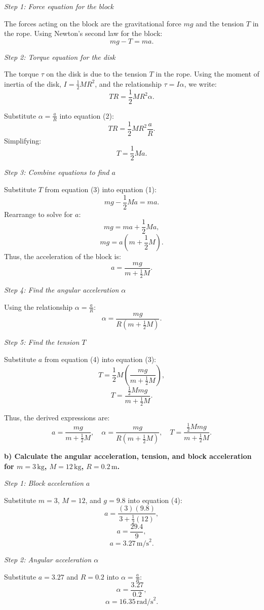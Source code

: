 \textit{Step 1: Force equation for the block}

The forces acting on the block are the gravitational force $mg$ and the tension $T$ in the rope. Using Newton's second law for the block:
\[
mg - T = ma. \tag{1}
\]

\textit{Step 2: Torque equation for the disk}

The torque $\tau$ on the disk is due to the tension $T$ in the rope. Using the moment of inertia of the disk, $I = \frac{1}{2}MR^2$, and the relationship $\tau = I\alpha$, we write:
\[
TR = \frac{1}{2}MR^2\alpha. \tag{2}
\]

Substitute $\alpha = \frac{a}{R}$ into equation (2):
\[
TR = \frac{1}{2}MR^2\frac{a}{R}.
\]
Simplifying:
\[
T = \frac{1}{2}Ma. \tag{3}
\]

\textit{Step 3: Combine equations to find $a$}

Substitute $T$ from equation (3) into equation (1):
\[
mg - \frac{1}{2}Ma = ma.
\]
Rearrange to solve for $a$:
\[
mg = ma + \frac{1}{2}Ma,
\]
\[
mg = a\left(m + \frac{1}{2}M\right).
\]
Thus, the acceleration of the block is:
\[
a = \frac{mg}{m + \frac{1}{2}M}. \tag{4}
\]

\textit{Step 4: Find the angular acceleration $\alpha$}

Using the relationship $\alpha = \frac{a}{R}$:
\[
\alpha = \frac{mg}{R\left(m + \frac{1}{2}M\right)}. \tag{5}
\]

\textit{Step 5: Find the tension $T$}

Substitute $a$ from equation (4) into equation (3):
\[
T = \frac{1}{2}M\left(\frac{mg}{m + \frac{1}{2}M}\right),
\]
\[
T = \frac{\frac{1}{2}Mmg}{m + \frac{1}{2}M}. \tag{6}
\]

Thus, the derived expressions are:
\[
a = \frac{mg}{m + \frac{1}{2}M}, \quad \alpha = \frac{mg}{R\left(m + \frac{1}{2}M\right)}, \quad T = \frac{\frac{1}{2}Mmg}{m + \frac{1}{2}M}.
\]

\textbf{b) Calculate the angular acceleration, tension, and block acceleration for $m = 3\,\text{kg}$, $M = 12\,\text{kg}$, $R = 0.2\,\text{m}$.}

\textit{Step 1: Block acceleration $a$}

Substitute $m = 3$, $M = 12$, and $g = 9.8$ into equation (4):
\[
a = \frac{(3)(9.8)}{3 + \frac{1}{2}(12)},
\]
\[
a = \frac{29.4}{9},
\]
\[
a = 3.27\,\text{m/s}^2.
\]

\textit{Step 2: Angular acceleration $\alpha$}

Substitute $a = 3.27$ and $R = 0.2$ into $\alpha = \frac{a}{R}$:
\[
\alpha = \frac{3.27}{0.2},
\]
\[
\alpha = 16.35\,\text{rad/s}^2.
\]

